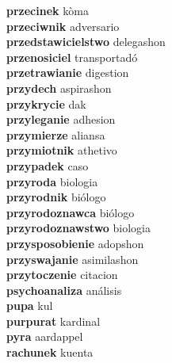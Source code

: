 \textbf{przecinek } kòma \\
\textbf{przeciwnik } adversario \\
\textbf{przedstawicielstwo } delegashon \\
\textbf{przenosiciel } transportadó \\
\textbf{przetrawianie } digestion \\
\textbf{przydech } aspirashon \\
\textbf{przykrycie } dak \\
\textbf{przyleganie } adhesion \\
\textbf{przymierze } aliansa \\
\textbf{przymiotnik } athetivo \\
\textbf{przypadek } caso \\
\textbf{przyroda } biologia \\
\textbf{przyrodnik } biólogo \\
\textbf{przyrodoznawca } biólogo \\
\textbf{przyrodoznawstwo } biologia \\
\textbf{przysposobienie } adopshon \\
\textbf{przyswajanie } asimilashon \\
\textbf{przytoczenie } citacion \\
\textbf{psychoanaliza } análisis \\
\textbf{pupa } kul \\
\textbf{purpurat } kardinal \\
\textbf{pyra } aardappel \\
\textbf{rachunek } kuenta \\
